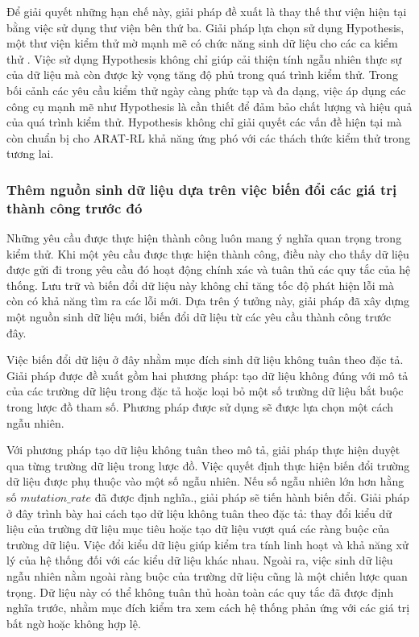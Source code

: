 Để giải quyết những hạn chế này, giải pháp đề xuất là thay thế thư viện hiện tại bằng việc sử dụng thư viện bên thứ ba. Giải pháp lựa chọn sử dụng Hypothesis, một thư viện kiểm thử mờ mạnh mẽ có chức năng sinh dữ liệu cho các ca kiểm thử \cite{hypothesis2016}. Việc sử dụng Hypothesis không chỉ giúp cải thiện tính ngẫu nhiên thực sự của dữ liệu mà còn được kỳ vọng tăng độ phủ trong quá trình kiểm thử. Trong bối cảnh các yêu cầu kiểm thử ngày càng phức tạp và đa dạng, việc áp dụng các công cụ mạnh mẽ như Hypothesis là cần thiết để đảm bảo chất lượng và hiệu quả của quá trình kiểm thử. Hypothesis không chỉ giải quyết các vấn đề hiện tại mà còn chuẩn bị cho ARAT-RL khả năng ứng phó với các thách thức kiểm thử trong tương lai.



\subsubsection{Thêm nguồn sinh dữ liệu dựa trên việc biến đổi các giá trị thành công trước đó}
Những yêu cầu được thực hiện thành công luôn mang ý nghĩa quan trọng trong kiểm thử. Khi một yêu cầu được thực hiện thành công, điều này cho thấy dữ liệu được gửi đi trong yêu cầu đó hoạt động chính xác và tuân thủ các quy tắc của hệ thống. Lưu trữ và biến đổi dữ liệu này không chỉ tăng tốc độ phát hiện lỗi mà còn có khả năng tìm ra các lỗi mới. Dựa trên ý tưởng này, giải pháp đã xây dựng một nguồn sinh dữ liệu mới, biến đổi dữ liệu từ các yêu cầu thành công trước đây.

Việc biến đổi dữ liệu ở đây nhằm mục đích sinh dữ liệu không tuân theo đặc tả. Giải pháp được đề xuất gồm hai phương pháp: tạo dữ liệu không đúng với mô tả của các trường dữ liệu trong đặc tả hoặc loại bỏ một số trường dữ liệu bắt buộc trong lược đồ tham số. Phương pháp được sử dụng sẽ được lựa chọn một cách ngẫu nhiên.

Với phương pháp tạo dữ liệu không tuân theo mô tả, giải pháp thực hiện duyệt qua từng trường dữ liệu trong lược đồ. Việc quyết định thực hiện biến đổi trường dữ liệu được phụ thuộc vào một số ngẫu nhiên. Nếu số ngẫu nhiên lớn hơn hằng số $mutation\_rate$ đã được định nghĩa.,
giải pháp  sẽ  tiến hành biến đổi. Giải pháp ở đây trình bày hai cách tạo dữ liệu không tuân theo đặc tả: thay đổi kiểu dữ liệu của trường dữ liệu mục tiêu hoặc tạo dữ liệu vượt quá các ràng buộc của trường dữ liệu. Việc đổi kiểu dữ liệu giúp kiểm tra tính linh hoạt và khả năng xử lý của hệ thống đối với các kiểu dữ liệu khác nhau.
Ngoài ra, việc sinh dữ liệu ngẫu nhiên nằm ngoài ràng buộc của trường dữ liệu cũng là một chiến lược quan trọng. Dữ liệu này có thể không tuân thủ hoàn toàn các quy tắc đã được định nghĩa trước, nhằm mục đích kiểm tra xem cách hệ thống phản ứng với các giá trị bất ngờ hoặc không hợp lệ.

